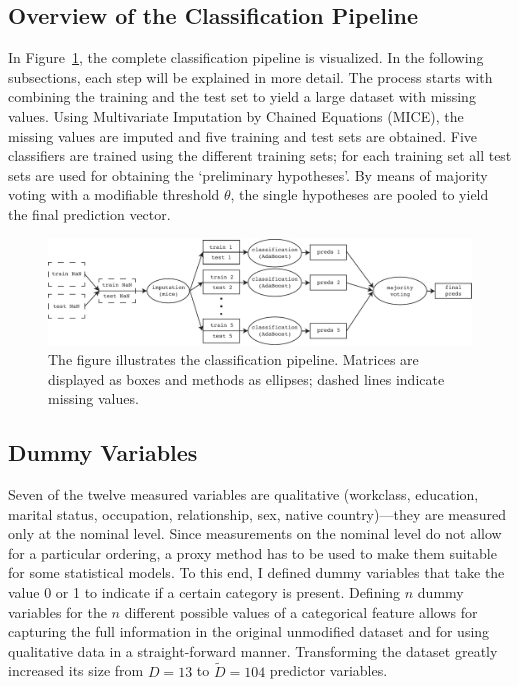 \documentclass[a4paper,11pt]{article}
\begin{document}
\subsection{Overview of the Classification Pipeline}

In Figure~\ref{fig:pipeline}, the complete classification pipeline is
visualized. In the following subsections, each step will be explained
in more detail. The process starts with combining the training and the
test set to yield a large dataset with missing values. Using
Multivariate Imputation by Chained Equations (MICE), the missing
values are imputed and five training and test sets are obtained. Five
classifiers are trained using the different training sets; for each
training set all test sets are used for obtaining the `preliminary
hypotheses'. By means of majority voting with a modifiable threshold
$\theta$, the single hypotheses are pooled to yield the final
prediction vector.

\begin{figure}[h!]
\begin{center}
\includegraphics[width=1\columnwidth]{pipeline}
\caption{{\label{fig:pipeline} The figure illustrates the
    classification pipeline. Matrices are displayed as boxes and
    methods as ellipses; dashed lines indicate missing values.%
  }}
\end{center}
\end{figure}

\subsection{Dummy Variables}

Seven of the twelve measured variables are qualitative (workclass,
education, marital status, occupation, relationship, sex, native
country)---they are measured only at the nominal level. Since
measurements on the nominal level do not allow for a particular
ordering, a proxy method has to be used to make them suitable for
some statistical models. To this end, I defined dummy variables that take
the value 0 or 1 to indicate if a certain category is
present. Defining $n$ dummy variables for the $n$ different possible
values of a categorical feature allows for capturing the full
information in the original unmodified dataset and for using
qualitative data in a straight-forward manner.
Transforming the dataset greatly increased its size from $D = 13$ to
$\tilde{D} = 104$ predictor variables.
\end{document}
